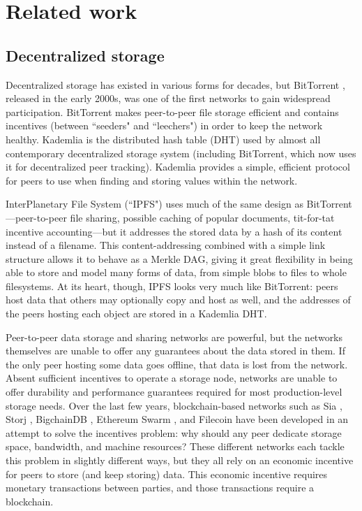 \documentclass[10pt]{article}
\begin{document}
\section{Related work}
\label{sec:related}

\subsection{Decentralized storage}
Decentralized storage has existed in various forms for decades, but BitTorrent \cite{bittorrent-protocol,bittorrent-review}, released in the early 2000s, was one of the first networks to gain widespread participation. BitTorrent makes peer-to-peer file storage efficient and contains incentives (between ``seeders" and ``leechers") in order to keep the network healthy. Kademlia \cite{kademlia} is the distributed hash table (DHT) used by almost all contemporary decentralized storage system (including BitTorrent, which now uses it for decentralized peer tracking). Kademlia provides a simple, efficient protocol for peers to use when finding and storing values within the network.

InterPlanetary File System (``IPFS") \cite{ipfs} uses much of the same design as BitTorrent---peer-to-peer file sharing, possible caching of popular documents, tit-for-tat incentive accounting---but it addresses the stored data by a hash of its content instead of a filename. This content-addressing combined with a simple link structure allows it to behave as a Merkle DAG, giving it great flexibility in being able to store and model many forms of data, from simple blobs to files to whole filesystems. At its heart, though, IPFS looks very much like BitTorrent: peers host data that others may optionally copy and host as well, and the addresses of the peers hosting each object are stored in a Kademlia DHT.

Peer-to-peer data storage and sharing networks are powerful, but the networks themselves are unable to offer any guarantees about the data stored in them. If the only peer hosting some data goes offline, that data is lost from the network. Absent sufficient incentives to operate a storage node, networks are unable to offer durability and performance guarantees required for most production-level storage needs. Over the last few years, blockchain-based networks such as Sia \cite{sia}, Storj \cite{storj}, BigchainDB \cite{bigchaindb,bigchaindb2}, Ethereum Swarm \cite{swarm1,swarm2}, and Filecoin \cite{filecoin} have been developed in an attempt to solve the incentives problem: why should any peer dedicate storage space, bandwidth, and machine resources? These different networks each tackle this problem in slightly different ways, but they all rely on an economic incentive for peers to store (and keep storing) data. This economic incentive requires monetary transactions between parties, and those transactions require a blockchain. 
\end{document}
